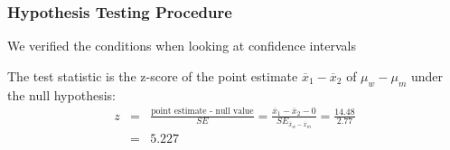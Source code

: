 \documentclass[slides]{beamer}
\newcommand{\blue}[1]{\textcolor{blue2}{#1}}
\newcommand{\xbar}{\overline{x}}
\begin{document}
\begin{frame}
\frametitle{Hypothesis Testing Procedure}\label{ht}
We verified the conditions when looking at confidence intervals

\vspace{0.5cm}

\pause The \blue{test statistic} is the z-score of the point estimate $\xbar_1 - \xbar_2$ of $\mu_w - \mu_m$ under the null hypothesis:
\begin{eqnarray*}
z &=& \frac{\mbox{point estimate - null value}}{SE} = \frac{\xbar_1 - \xbar_2 - 0}{SE_{\xbar_w - \xbar_m}} = \frac{14.48}{2.77}\\
&=& 5.227
\end{eqnarray*}

\end{frame}
\end{document}
